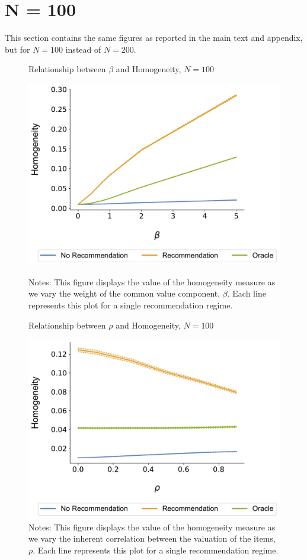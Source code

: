 \documentclass[format=acmsmall, review=true]{acmart}
\begin{document}
\addtocounter{figure}{-1}



\clearpage
\section{N = 100}
This section contains the same figures as reported in the main text and appendix, but for $N = 100$ instead of $N = 200$.

\begin{figure}[ht]
\caption{Relationship between $\beta$ and Homogeneity, $N = 100$}
\includegraphics[width=.45\linewidth]{figures/beta_homogeneity_N_100_T_20}\label{fig:beta_homo}
\caption*{\scriptsize Notes: This figure displays the value of the homogeneity measure as we vary the weight of the common value component, $\beta$. Each line represents this plot for a single recommendation regime.}
\end{figure}
\begin{figure}[ht]
\caption{Relationship between $\rho$ and Homogeneity, $N = 100$}
\includegraphics[width=.45\linewidth]{figures/rho_homogeneity_N_100_T_20}
\caption*{\scriptsize Notes: This figure displays the value of the homogeneity measure as we vary the inherent correlation between the valuation of the items, $\rho$. Each line represents this plot for a single recommendation regime.}\label{fig:cor_homo}
\end{figure}
\end{document}
